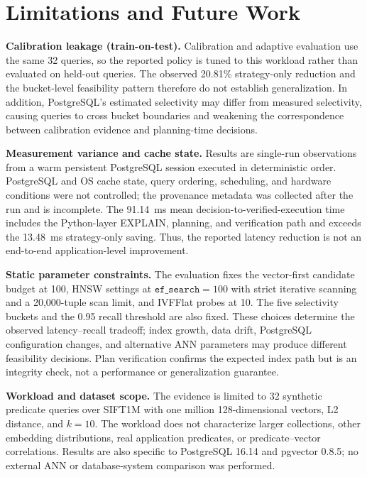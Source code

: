 \documentclass[10pt,twocolumn]{article}
\begin{document}
\section{Limitations and Future Work}
\label{sec:threats}

\textbf{Calibration leakage (train-on-test).} Calibration and adaptive evaluation use the same 32 queries, so the reported policy is tuned to this workload rather than evaluated on held-out queries. The observed 20.81\% strategy-only reduction and the bucket-level feasibility pattern therefore do not establish generalization. In addition, PostgreSQL's estimated selectivity may differ from measured selectivity, causing queries to cross bucket boundaries and weakening the correspondence between calibration evidence and planning-time decisions.

\textbf{Measurement variance and cache state.} Results are single-run observations from a warm persistent PostgreSQL session executed in deterministic order. PostgreSQL and OS cache state, query ordering, scheduling, and hardware conditions were not controlled; the provenance metadata was collected after the run and is incomplete. The 91.14~ms mean decision-to-verified-execution time includes the Python-layer EXPLAIN, planning, and verification path and exceeds the 13.48~ms strategy-only saving. Thus, the reported latency reduction is not an end-to-end application-level improvement.

\textbf{Static parameter constraints.} The evaluation fixes the vector-first candidate budget at 100, HNSW settings at $\texttt{ef\_search}=100$ with strict iterative scanning and a 20,000-tuple scan limit, and IVFFlat probes at 10. The five selectivity buckets and the 0.95 recall threshold are also fixed. These choices determine the observed latency--recall tradeoff; index growth, data drift, PostgreSQL configuration changes, and alternative ANN parameters may produce different feasibility decisions. Plan verification confirms the expected index path but is an integrity check, not a performance or generalization guarantee.

\textbf{Workload and dataset scope.} The evidence is limited to 32 synthetic predicate queries over SIFT1M with one million 128-dimensional vectors, L2 distance, and $k=10$. The workload does not characterize larger collections, other embedding distributions, real application predicates, or predicate--vector correlations. Results are also specific to PostgreSQL 16.14 and pgvector 0.8.5; no external ANN or database-system comparison was performed.
\end{document}
